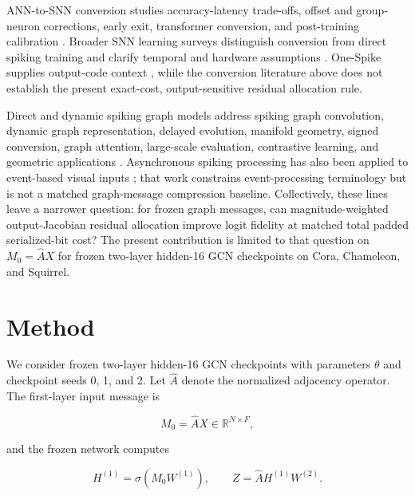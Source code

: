 \documentclass{article}
\begin{document}
ANN-to-SNN conversion studies accuracy-latency trade-offs, offset and group-neuron corrections, early exit, transformer conversion, and post-training calibration \cite{one-spike,hao2023offset,lv2024group,bu2023optimal,li2023seenn,you2024spikezip,zhao2025ttfs,huang2025ecmt,li2024erroraware}. Broader SNN learning surveys distinguish conversion from direct spiking training and clarify temporal and hardware assumptions \cite{dampfhoffer2023snnlearning,nunes2022snnsurvey,wang2022taxonomicsnn}. One-Spike supplies output-code context \cite{one-spike}, while the conversion literature above does not establish the present exact-cost, output-sensitive residual allocation rule.

Direct and dynamic spiking graph models address spiking graph convolution, dynamic graph representation, delayed evolution, manifold geometry, signed conversion, graph attention, large-scale evaluation, contrastive learning, and geometric applications \cite{spikinggcn,spikenet,dy-sign,delay-dsgn,signnn,msg,negative-spike,sun2024spikegraphormer,zhang2025sgnnbench,li2023graph1bit,chaurasia2026sgspose}. Asynchronous spiking processing has also been applied to event-based visual inputs \cite{asgcn}; that work constrains event-processing terminology but is not a matched graph-message compression baseline. Collectively, these lines leave a narrower question: for frozen graph messages, can magnitude-weighted output-Jacobian residual allocation improve logit fidelity at matched total padded serialized-bit cost? The present contribution is limited to that question on \(M_0=\hat{A}X\) for frozen two-layer hidden-16 GCN checkpoints on Cora, Chameleon, and Squirrel.

\section{Method}

\label{sec:method}

We consider frozen two-layer hidden-16 GCN checkpoints with parameters \(\theta\) and checkpoint seeds 0, 1, and 2. Let \(\hat{A}\) denote the normalized adjacency operator. The first-layer input message is

\begin{equation}
M_0=\hat{A}X\in\mathbb{R}^{N\times F},
\end{equation}

and the frozen network computes

\begin{equation}
H^{(1)}=\sigma(M_0W^{(1)}), \qquad Z=\hat{A}H^{(1)}W^{(2)}.
\end{equation}
\end{document}

